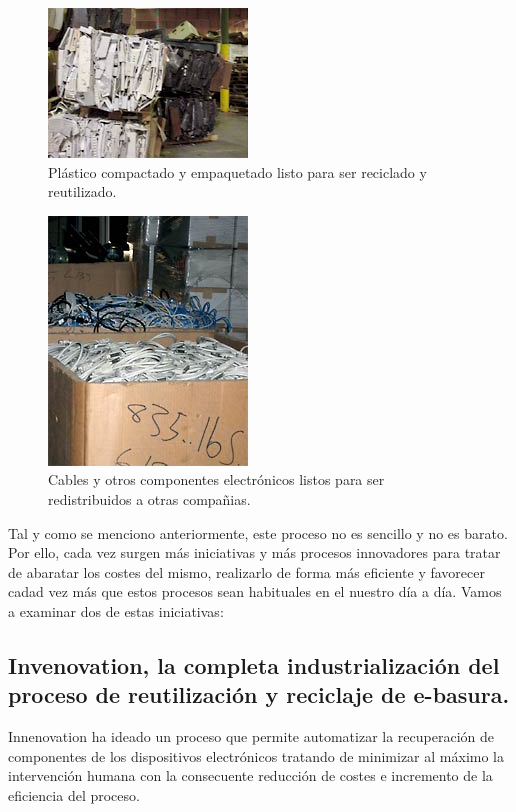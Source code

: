 \begin{figure}[H]
\begin{center}
\includegraphics[]{img/ewaste_5}
\caption{Plástico compactado y empaquetado listo para ser reciclado y reutilizado.}
\end{center}
\end{figure}

\begin{figure}[H]
\begin{center}
\includegraphics[]{img/ewaste_6}
\caption{Cables y otros componentes electrónicos listos para ser redistribuidos a otras compañias.}
\end{center}
\end{figure}

Tal y como se menciono anteriormente, este proceso no es sencillo y no es barato. Por ello, cada vez surgen más iniciativas y más procesos innovadores para tratar de abaratar los costes del mismo, realizarlo de forma más eficiente y favorecer cadad vez más que estos procesos sean habituales en el nuestro día a día. Vamos a examinar dos de estas iniciativas:

\subsection{Invenovation, la completa industrialización del proceso de reutilización y reciclaje de e-basura.}

Innenovation \cite{invenovation} ha ideado un proceso que permite automatizar la recuperación de componentes de los dispositivos electrónicos tratando de minimizar al máximo la intervención humana con la consecuente reducción de costes e incremento de la eficiencia del proceso. 

